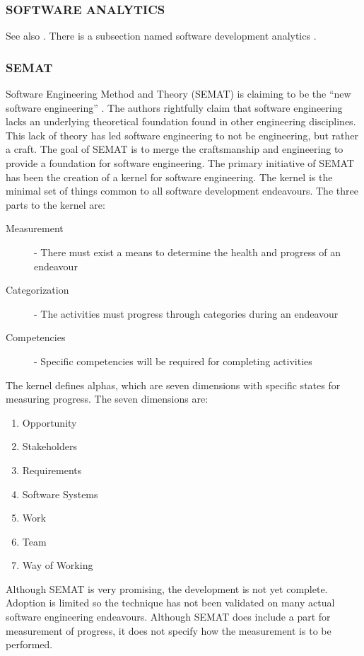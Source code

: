 \documentclass[SDSUThesis.tex]{subfiles}
\begin{document}
\subsubsection{SOFTWARE ANALYTICS}
See also \cite{Buse2010}.  There is a subsection named
software development analytics \cite{Menzies2012}.

\subsubsection{SEMAT}

    Software Engineering Method and Theory (SEMAT) is claiming to be the ``new software engineering'' 
    \cite{Jacobson2014}.  The authors rightfully claim that software engineering lacks
    an underlying theoretical foundation found in other engineering disciplines.  This lack of theory
    has led software engineering to not be engineering, but rather a craft.  The goal of 
    SEMAT is to merge the craftsmanship and engineering to provide a foundation for software
    engineering.  The primary initiative of SEMAT has been the creation of a kernel for 
    software engineering.  The kernel is the minimal set of things common to all software development
    endeavours. The three parts to the kernel are:
    \begin{description}
        \item[Measurement] - There must exist a means to determine the health and progress of an endeavour
        \item[Categorization]-  The activities must progress through categories during an endeavour
        \item[Competencies] - Specific competencies will be required for completing activities
    \end{description}
    The kernel defines alphas, which are seven dimensions with
    specific states for measuring progress. 
    The seven dimensions are: 
    \begin{enumerate}
        \item Opportunity
        \item Stakeholders
        \item Requirements
        \item Software Systems
        \item Work
        \item Team
        \item Way of Working
    \end{enumerate}
    
    Although SEMAT is very promising, the development is not yet complete.  Adoption is
    limited so the technique has not been validated on many
    actual software engineering endeavours.  Although SEMAT does include a part for
    measurement of progress, it does not specify how the measurement is to be 
    performed.
\end{document}
